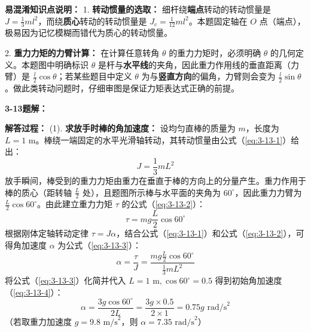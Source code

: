 \vspace{1em}

\textbf{易混淆知识点说明：}
1. \textbf{转动惯量的选取：} 细杆绕\textbf{端点}转动的转动惯量是 $J = \frac{1}{3}ml^2$，而绕\textbf{质心}转动的转动惯量是 $J_c = \frac{1}{12}ml^2$。本题固定轴在 $O$ 点（端点），极易因为记忆模糊而错代为质心的转动惯量。

2. \textbf{重力力矩的力臂计算：} 在计算任意转角 $\theta$ 的重力力矩时，必须明确 $\theta$ 的几何定义。本题图中明确标识 $\theta$ 是杆与\textbf{水平线}的夹角，因此重力作用线的垂直距离（力臂）是 $\frac{l}{2}\cos\theta$；若某些题目中定义 $\theta$ 为与\textbf{竖直方向}的偏角，力臂则会变为 $\frac{l}{2}\sin\theta$。做此类转动问题时，仔细审图是保证力矩表达式正确的前提。

\vspace{2em}

\textbf{3-13题解：}
\setcounter{equation}{0}
\renewcommand{\theHequation}{3-13.\arabic{equation}}

\textbf{解答过程：}
(1). \textbf{求放手时棒的角加速度：}
设均匀直棒的质量为 $m$，长度为 $L = 1\text{ m}$。棒绕一端固定的水平光滑轴转动，其转动惯量由公式（\ref{eq:3-13-1}）给出：
\begin{equation}\label{eq:3-13-1}
	J = \frac{1}{3}mL^2
\end{equation}
放手瞬间，棒受到的重力力矩由重力在垂直于棒的方向上的分量产生。重力作用于棒的质心（距转轴 $\frac{L}{2}$ 处），且题图所示棒与水平面的夹角为 $60^\circ$，因此重力力臂为 $\frac{L}{2} \cos 60^\circ$。由此建立重力力矩 $\tau$ 的公式（\ref{eq:3-13-2}）：
\begin{equation}\label{eq:3-13-2}
	\tau = mg \frac{L}{2} \cos 60^\circ
\end{equation}
根据刚体定轴转动定律 $\tau = J\alpha$，结合公式（\ref{eq:3-13-1}）和公式（\ref{eq:3-13-2}），可得角加速度 $\alpha$ 为公式（\ref{eq:3-13-3}）：
\begin{equation}\label{eq:3-13-3}
	\alpha = \frac{\tau}{J} = \frac{mg \frac{L}{2} \cos 60^\circ}{\frac{1}{3}mL^2}
\end{equation}
将公式（\ref{eq:3-13-3}）化简并代入 $L = 1\text{ m}, \cos 60^\circ = 0.5$ 得到初始角加速度（\ref{eq:3-13-4}）：
\begin{equation}\label{eq:3-13-4}
	\alpha = \frac{3g \cos 60^\circ}{2L} = \frac{3g \times 0.5}{2 \times 1} = 0.75g \text{ rad/s}^2
\end{equation}
（若取重力加速度 $g = 9.8\text{ m/s}^2$，则 $\alpha = 7.35\text{ rad/s}^2$）

